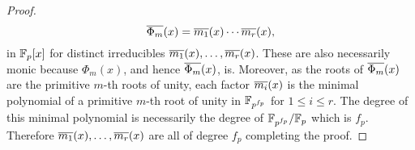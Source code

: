 \begin{proof}
      \[
        \overline{\Phi_{m}}(x) = \overline{m_{1}}(x) \cdots \overline{m_{r}}(x),
      \]
      in $\mathbb{F}_{p}[x]$ for distinct irreducibles $\overline{m_{1}}(x),\ldots,\overline{m_{r}}(x)$. These are also necessarily monic because $\Phi_{m}(x)$, and hence $\overline{\Phi_{m}}(x)$, is. Moreover, as the roots of $\overline{\Phi_{m}}(x)$ are the primitive $m$-th roots of unity, each factor $\overline{m_{i}}(x)$ is the minimal polynomial of a primitive $m$-th root of unity in $\mathbb{F}_{p^{f_{p}}}$ for $1 \le i \le r$. The degree of this minimal polynomial is necessarily the degree of $\mathbb{F}_{p^{f_{p}}}/\mathbb{F}_{p}$ which is $f_{p}$. Therefore $\overline{m_{1}}(x),\ldots,\overline{m_{r}}(x)$ are all of degree $f_{p}$ completing the proof.
    \end{proof}